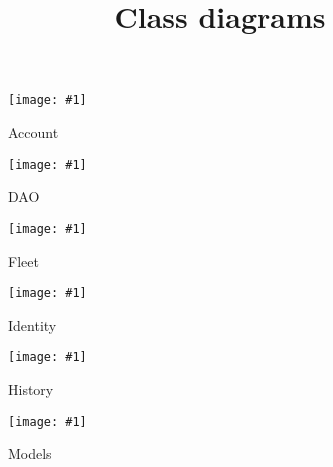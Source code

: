 \documentclass{article}
\newcommand{\diagram}[2]{
	\texttt{[image: \#1]}
	\caption{#2}
}
\newcommand{\vertdiagram}[2]{
	\begin{sidewaysfigure}
		\diagram{#1}{#2}
	\end{sidewaysfigure}
}
\begin{document}
	\title{Class diagrams}
	\date{}
	\maketitle
	\vertdiagram{ClassDiagramAccount}{Account}
	\vertdiagram{ClassDiagramDAO}{DAO}
	\vertdiagram{ClassDiagramFleet}{Fleet}
	\vertdiagram{ClassDiagramIdentity}{Identity}
	\vertdiagram{ClassDiagramHistory}{History}
	\vertdiagram{ClassDiagramModels}{Models}
\end{document}
